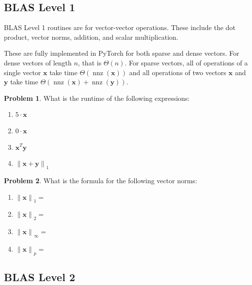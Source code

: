 \documentclass[10pt]{article}
\theoremstyle{definition}
\newtheorem{problem}{Problem}
\DeclareMathOperator{\nnz}{nnz}
\newcommand{\trans}[1]{{#1}^{T}}
\newcommand{\x}{\mathbf x}
\newcommand{\y}{\mathbf y}
\newcommand{\lone}[1]{{\lVert {#1} \rVert}_1}
\newcommand{\ltwo}[1]{{\lVert {#1} \rVert}_2}
\newcommand{\lp}[1]{{\lVert {#1} \rVert}_p}
\newcommand{\linf}[1]{{\lVert {#1} \rVert}_\infty}
\begin{document}
\subsection{BLAS Level 1}

BLAS Level 1 routines are for vector-vector operations.
These include the dot product, vector norms, addition, and scalar multiplication.

These are fully implemented in PyTorch for both sparse and dense vectors.
For dense vectors of length $n$, that is $\Theta(n)$.
For sparse vectors, all of operations of a single vector $\x$ take time $\Theta(\nnz(\x))$
and all operations of two vectors $\x$ and $\y$ take time $\Theta(\nnz(\x)+\nnz(\y))$.

\begin{problem}
    What is the runtime of the following expressions:
    \begin{enumerate}
        \item $5 \cdot \x$
            \vspace{1in}
        \item $0 \cdot \x$
            \vspace{1in}
        \item $\trans\x \y$
            \vspace{1in}
        \item $\lone{\x+\y}$
            \vspace{1in}
    \end{enumerate}
\end{problem}

\begin{problem}
    What is the formula for the following vector norms:
    \begin{enumerate}
        \item $\lone{\x}=$
            \vspace{1in}
        \item $\ltwo{\x}=$
            \vspace{1in}
        \item $\linf{\x}=$
            \vspace{1in}
        \item $\lp{\x}=$
            \vspace{1in}
    \end{enumerate}
\end{problem}

\subsection{BLAS Level 2}
\end{document}
